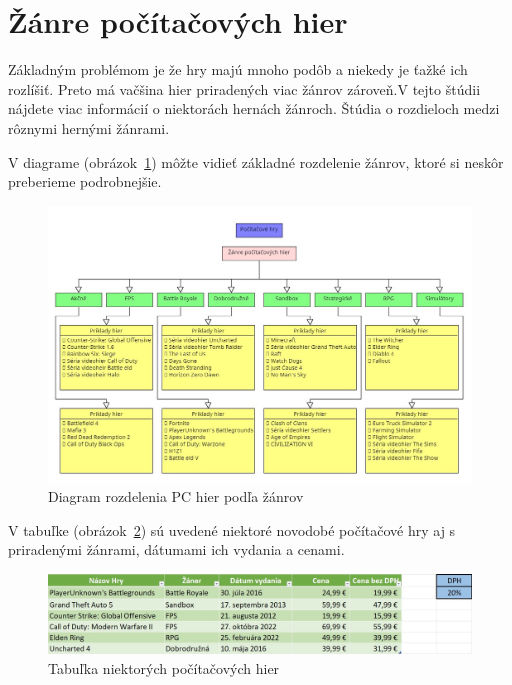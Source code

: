 \documentclass[10pt,oneside,slovak,a4paper]{article}
\begin{document}
\section{Žánre počítačových hier} \label{zanre}

Základným problémom je že hry majú mnoho podôb a niekedy je ťažké ich rozlíšiť. Preto má vačšina hier priradených viac žánrov zároveň.V tejto štúdii nájdete viac informácií o niektorách hernách žánroch\cite{9618902}. Štúdia o rozdieloch medzi rôznymi hernými žánrami\cite{4561861}.

V diagrame (obrázok~\ref{f:dia}) môžte vidieť základné rozdelenie žánrov, ktoré si neskôr preberieme podrobnejšie.

\pagebreak

\begin{figure}[h]
\centering
\includegraphics[scale=0.4]{Screenshot_4.jpg}
\caption{Diagram rozdelenia PC hier podľa žánrov}
\label{f:dia}
\end{figure}

V tabuľke (obrázok~\ref{f:tab}) sú uvedené niektoré novodobé počítačové hry aj s priradenými žánrami, dátumami ich vydania a cenami.

\begin{figure}[h]
\centering
\includegraphics[scale=0.315]{tab.jpg}
\caption{Tabuľka niektorých počítačových hier}
\label{f:tab}
\end{figure}
\end{document}
